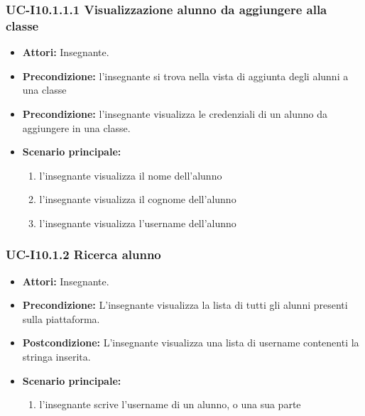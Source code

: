 \subsubsection{UC-I10.1.1.1 Visualizzazione alunno da aggiungere alla classe}
\begin{itemize}
	\item \textbf{Attori:} Insegnante.
	\item \textbf{Precondizione:} l'insegnante si trova nella vista di aggiunta degli alunni a una classe
	\item \textbf{Precondizione:} l'insegnante visualizza le credenziali di un alunno da aggiungere in una classe.
	\item \textbf{Scenario principale:}
	\begin{enumerate}
		\item l'insegnante visualizza il nome dell'alunno
		\item l'insegnante visualizza il cognome dell'alunno
		\item l'insegnante visualizza l'username dell'alunno
	\end{enumerate}
\end{itemize}

\subsubsection{UC-I10.1.2 Ricerca alunno}
\begin{itemize}
	\item \textbf{Attori:} Insegnante.
	\item \textbf{Precondizione:} L'insegnante visualizza la lista di tutti gli alunni presenti sulla piattaforma.
	\item \textbf{Postcondizione:} L'insegnante visualizza una lista di username contenenti la stringa inserita.
	\item \textbf{Scenario principale:}
	\begin{enumerate}
		\item l'insegnante scrive l'username di un alunno, o una sua parte
	\end{enumerate}
\end{itemize}


